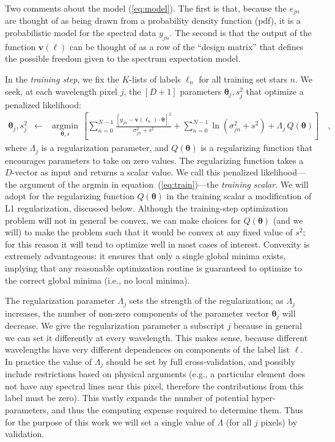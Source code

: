 \documentclass[12pt,preprint]{aastex}
\newcommand{\Dvector}[1]{\boldsymbol{#1}}
\newcommand{\vectheta}{\Dvector{\theta}}
\newcommand{\vecv}{\Dvector{v}}
\newcommand{\argmin}[1]{\underset{#1}{\operatorname{argmin}}\,}
\begin{document}
Two comments about the model (\ref{eq:model}).  The first is that, because the 
$e_{jn}$ are thought of as being drawn from a probability density function (pdf),
it is a probabilistic model for the spectral data $y_{jn}$.  The second is that
the output of the function $\vecv(\ell)$ can be thought of as a row of the 
``design matrix'' that defines the possible freedom given to the spectrum 
expectation model.


In the \emph{training step}, we fix the $K$-lists of labels $\ell_n$ for all 
training set stars $n$.  We seek, at each wavelength pixel $j$, the $[D+1]$ 
parameters $\vectheta_j,s^2_j$ that optimize a penalized likelihood:
\begin{eqnarray}\label{eq:train}
  \vectheta_j,s^2_j &\leftarrow& \argmin{\vectheta,s}\left[
    \sum_{n=0}^{N-1} \frac{[y_{jn}-\vecv(\ell_n)\cdot\vectheta]^2}{\sigma^2_{jn}+s^2}
    + \sum_{n=0}^{N-1} \ln(\sigma^2_{jn}+s^2)
    + \Lambda_j\,Q(\vectheta)
    \right]
  \quad ,
\end{eqnarray}
where $\Lambda_j$ is a regularization parameter, and $Q(\vectheta)$ is a 
regularizing function that encourages parameters to take on zero values.  The 
regularizing function takes a $D$-vector as input and returns a scalar value.
We call this penalized likelihood---the argument of the argmin in 
equation~(\ref{eq:train})---the \emph{training scalar}.  We will adopt for the 
regularizing function $Q(\vectheta)$ in the training scalar a modification of L1
regularization, discussed below.  Although the training-step optimization 
problem will not in general be convex, we can make choices for $Q(\vectheta)$ 
(and we will) to make the problem such that it would be convex at any fixed 
value of $s^2$; for this reason it will tend to optimize well in most cases of 
interest. Convexity is extremely advantageous: it ensures that only a single
global minima exists, implying that any reasonable optimization routine is
guaranteed to optimize to the correct global minima (i.e., no local minima).


The regularization parameter $\Lambda_j$ sets the strength of the 
regularization; as $\Lambda_j$ increases, the number of non-zero components of 
the parameter vector $\vectheta_j$ will decrease.  We give the regularization 
parameter a subscript $j$ because in general we can set it differently at every
wavelength.  This makes sense, because different wavelengths have very different
dependences on components of the label list $\ell$.  In practice the
value of $\Lambda_j$ should be set by full cross-validation, and possibly 
include restrictions based on physical arguments (e.g., a particular element 
does not have any spectral lines near this pixel, therefore the contributions
from this label must be zero).  This vastly expands the number of potential 
hyper-parameters, and thus the computing expense required to determine them.  
Thus for the purpose of this work we will set a single value of $\Lambda$ (for 
all $j$ pixels) by validation.
\end{document}
